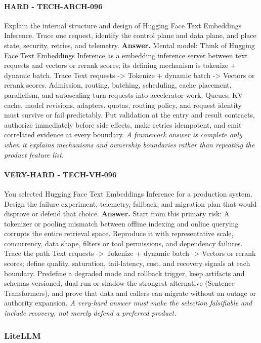 \paragraph{HARD - TECH-ARCH-096} Explain the internal structure and design of Hugging Face Text Embeddings Inference. Trace one request, identify the control plane and data plane, and place state, security, retries, and telemetry.
\textbf{Answer.} Mental model: Think of Hugging Face Text Embeddings Inference as a embedding inference server between text requests and vectors or rerank scores; its defining mechanism is tokenize + dynamic batch. Trace Text requests -> Tokenize + dynamic batch -> Vectors or rerank scores. Admission, routing, batching, scheduling, cache placement, parallelism, and autoscaling turn requests into accelerator work. Queues, KV cache, model revisions, adapters, quotas, routing policy, and request identity must survive or fail predictably. Put validation at the entry and result contracts, authorize immediately before side effects, make retries idempotent, and emit correlated evidence at every boundary.
\textit{A framework answer is complete only when it explains mechanisms and ownership boundaries rather than repeating the product feature list.}
\paragraph{VERY-HARD - TECH-VH-096} You selected Hugging Face Text Embeddings Inference for a production system. Design the failure experiment, telemetry, fallback, and migration plan that would disprove or defend that choice.
\textbf{Answer.} Start from this primary risk: A tokenizer or pooling mismatch between offline indexing and online querying corrupts the entire retrieval space. Reproduce it with representative scale, concurrency, data shape, filters or tool permissions, and dependency failures. Trace the path Text requests -> Tokenize + dynamic batch -> Vectors or rerank scores; define quality, saturation, tail-latency, cost, and recovery signals at each boundary. Predefine a degraded mode and rollback trigger, keep artifacts and schemas versioned, dual-run or shadow the strongest alternative (Sentence Transformers), and prove that data and callers can migrate without an outage or authority expansion.
\textit{A very-hard answer must make the selection falsifiable and include recovery, not merely defend a preferred product.}
\subsubsection*{LiteLLM}
